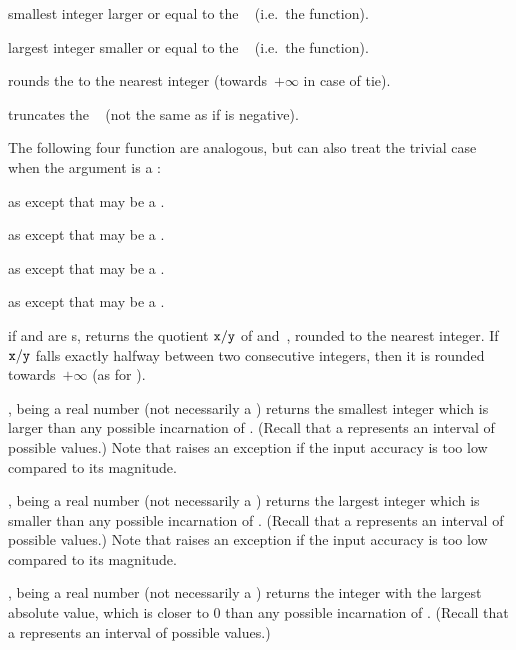  smallest integer larger or equal
to the ~ (i.e.~the  function).

 largest integer smaller or equal to the
~ (i.e.~the  function).

 rounds the   to the nearest integer
(towards~$+\infty$ in case of tie).

 truncates the ~ (not the same as
 if  is negative).

The following four function are analogous, but can also treat the trivial
case when the argument is a :

as  except that  may be a .

as  except that  may be a .

as  except that  may be a .

as  except that  may be a .

 if  and  are s,
returns the quotient ${\tt x}/{\tt y}$ of  and~, rounded to
the nearest integer. If ${\tt x}/{\tt y}$ falls exactly halfway between
two consecutive integers, then it is rounded towards~$+\infty$ (as for
).

,  being a real number (not necessarily a
) returns the smallest integer which is larger than any possible
incarnation of . (Recall that a  represents an interval of
possible values.) Note that  raises an exception if the input
accuracy is too low compared to its magnitude.

,  being a real number (not necessarily a
) returns the largest integer which is smaller than any possible
incarnation of . (Recall that a  represents an interval of
possible values.) Note that  raises an exception if the input
accuracy is too low compared to its magnitude.

,  being a real number (not necessarily a
) returns the integer with the largest absolute value, which is closer
to $0$ than any possible incarnation of . (Recall that a 
represents an interval of possible values.)

